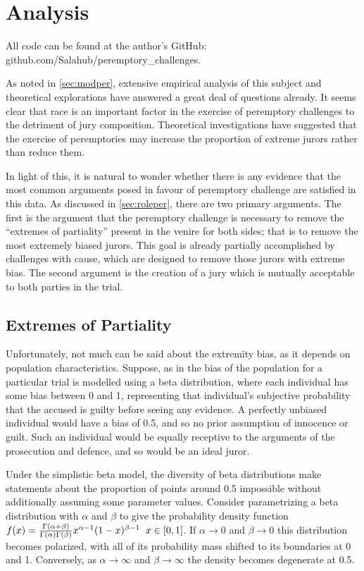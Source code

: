 \section{Analysis} \label{c:analysis}

All code can be found at the author's GitHub: github.com/Salahub/peremptory\_challenges.

 As noted in \ref{sec:modper}, extensive empirical analysis of this subject and theoretical explorations have answered a great deal of questions already. It
seems clear that race is an important factor in the exercise of peremptory challenges to the detriment of
jury composition. Theoretical investigations have suggested that the exercise of peremptories may increase the proportion of
extreme jurors rather than reduce them.

In light of this, it is natural to wonder whether there is any evidence that the most common arguments posed in favour of
peremptory challenge are satisfied in this data. As discussed in \ref{sec:roleper}, there are two primary arguments. The first is
the argument that the peremptory challenge is necessary to remove the ``extremes of partiality'' present in the venire for both
sides; that is to remove the most extremely biased jurors. This goal is already partially accomplished by challenges with cause, which are  designed to remove those jurors with extreme bias. The second argument is the creation of a jury which
is mutually acceptable to both parties in the trial.

\subsection{Extremes of Partiality} \label{sec:extremes}

Unfortunately, not much can be said about the extremity bias, as it depends on population characteristics. Suppose, as in \cite{ford2010} the bias of the population for a particular
trial is modelled using a beta distribution, where each individual has some bias between 0 and 1, representing that
individual's subjective probability that the accused is guilty before seeing any evidence. A perfectly unbiased individual would
have a bias of 0.5, and so no prior assumption of innocence or guilt. Such an individual would be equally receptive to the arguments of the
prosecution and defence, and so would be an ideal juror.

Under the simplistic beta model, the diversity of beta distributions make statements about
the proportion of points around 0.5 impossible without additionally assuming some parameter values. Consider parametrizing a beta distribution with $\alpha$ and $\beta$ to give the probability density function $f(x) = \frac{\Gamma (\alpha + \beta)}{\Gamma (\alpha) \Gamma (\beta)} x^{\alpha-1} (1-x)^{\beta-1}
\hspace{0.2cm} x \in [0,1]$. If $\alpha \rightarrow 0$ and $\beta \rightarrow 0$ this distribution becomes polarized,
with all of its probability mass shifted to its boundaries at 0 and 1. Conversely, as $\alpha \rightarrow \infty$ and $\beta
\rightarrow \infty$ the density becomes degenerate at 0.5.

